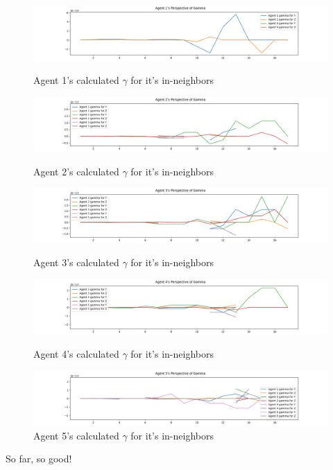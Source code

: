 \documentclass[11pt]{article}
\begin{document}
\begin{figure}[h!]
    \centering
    \includegraphics[width=\textwidth]{img/vanilla_agent_0_gammas.png}
    \caption{Agent 1's calculated $\gamma$ for it's in-neighbors}
    \label{fig:gg0}

    \includegraphics[width=\textwidth]{img/vanilla_agent_1_gammas.png}
    \caption{Agent 2's calculated $\gamma$ for it's in-neighbors}
    \label{fig:gg1}

    \includegraphics[width=\textwidth]{img/vanilla_agent_2_gammas.png}
    \caption{Agent 3's calculated $\gamma$ for it's in-neighbors}
    \label{fig:gg2}

    \includegraphics[width=\textwidth]{img/vanilla_agent_3_gammas.png}
    \caption{Agent 4's calculated $\gamma$ for it's in-neighbors}
    \label{fig:gg3}

    \includegraphics[width=\textwidth]{img/vanilla_agent_4_gammas.png}
    \caption{Agent 5's calculated $\gamma$ for it's in-neighbors}
    \label{fig:gg4}
\end{figure}
So far, so good!
\end{document}
